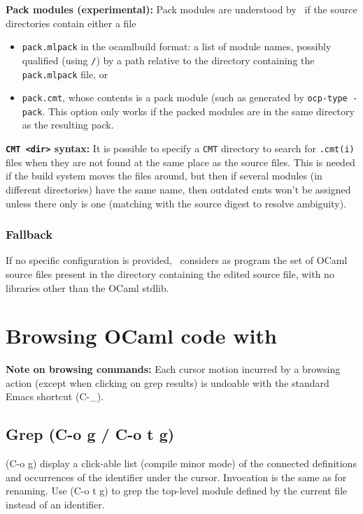 {\bf Pack modules (experimental):} Pack modules are understood by
\typerex\ if the source directories contain either a file
\begin{itemize}
\item \verb!pack.mlpack! in the ocamlbuild format: a list of module
  names, possibly qualified (using \verb!/!) by a path relative to the
  directory containing the \verb!pack.mlpack! file, or
\item \verb!pack.cmt!, whose contents is a pack module (such as
  generated by \verb!ocp-type -pack!. This option only works if the
  packed modules are in the same directory as the resulting pack.
\end{itemize}

{\bf \verb!CMT <dir>! syntax:} It is possible to specify a \verb!CMT!
directory to search for \verb!.cmt(i)! files when they are not found
at the same place as the source files. This is needed if the build
system moves the files around, but then if several modules (in
different directories) have the same name, then outdated cmts won't be
assigned unless there only is one (matching with the source digest to
resolve ambiguity).



\subsubsection{Fallback}

If no specific configuration is provided, \typerex\ considers as
program the set of OCaml source files present in the directory
containing the edited source file, with no libraries other than the
OCaml stdlib.

\section{Browsing OCaml code with \typerex}

{\bf Note on browsing commands:} Each cursor motion incurred by a
browsing action (except when clicking on grep results) is undoable
with the standard Emacs shortcut (C-\_).

\subsection{Grep (C-o g / C-o t g)}
(C-o g) display a click-able list (compile minor mode) of the connected
definitions and occurrences of the identifier under the cursor. Invocation
is the same as for renaming. Use (C-o t g) to grep the top-level module
defined by the current file instead of an identifier.

